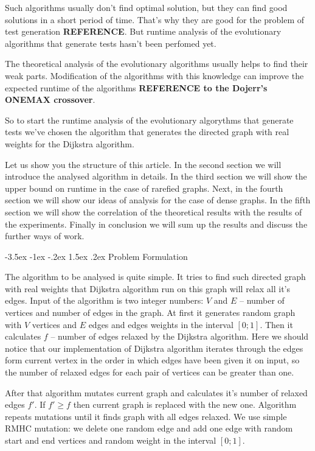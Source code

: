 \documentclass[a4paper,10pt]{article}
\makeatletter
\theoremstyle{definition}
\renewcommand\section{\@startsection {section}{1}{\z@}%
                                   {-3.5ex \@plus -1ex \@minus -.2ex}%
                                   {1.5ex \@plus.2ex}%
                                   {\large\bfseries}}
\makeatother
\begin{document}
Such algorithms usually don't find optimal solution, but they can find good solutions in a short period of time. That's why they are good for the problem of test generation \textbf{REFERENCE}. But runtime analysis of the evolutionary algorithms that generate tests hasn't been perfomed yet. 

The theoretical analysis of the evolutionary algorithms usually helps to find their weak parts. Modification of the algorithms with this knowledge can improve the expected runtime of the algorithms \textbf{REFERENCE to the Dojerr's ONEMAX crossover}.

So to start the runtime analysis of the evolutionary algorythms that generate tests we've chosen the algorithm that generates the directed graph with real weights for the Dijkstra algorithm.

Let us show you the structure of this article. In the second section we will introduce the analysed algorithm in details. In the third section we will show the upper bound on runtime in the case of rarefied graphs. Next, in the fourth section we will show our ideas of analysis for the case of dense graphs. In the fifth section we will show the correlation of the theoretical results with the results of the experiments. Finally in conclusion we will sum up the results and discuss the further ways of work.


\section{Problem Formulation}
\label{sec:2}

The algorithm to be analysed is quite simple. It tries to find such directed graph with real weights that Dijkstra algorithm run on this graph will relax all it's edges. 
Input of the algorithm is two integer numbers: $V$ and $E$ -- number of vertices and number of edges in the graph. At first it generates random graph with $V$ vertices and $E$ edges and edges weights in the interval $[0; 1]$. Then it calculates $f$ -- number of edges relaxed by the Dijkstra algorithm. Here we should notice that our implementation of Dijkstra algorithm iterates through the edges form current vertex in the order in which edges have been given it on input, so the number of relaxed edges for each pair of vertices can be greater than one. 

After that algorithm mutates current graph and calculates it's number of relaxed edges $f'$. If $f' \ge f$ then current graph is replaced with the new one. Algorithm repeats mutations until it finds graph with all edges relaxed. We use simple RMHC mutation: we delete one random edge and add one edge with random start and end vertices and random weight in the interval $[0; 1]$.
\end{document}
